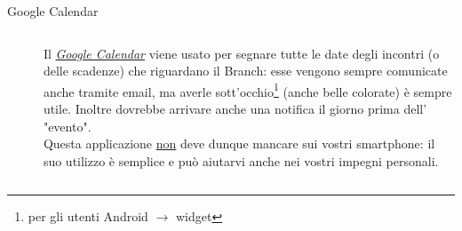 \documentclass{beamer}
\begin{document}
\begin{frame}{Google Calendar}
\begin{columns}
\begin{column}{0.5\linewidth}
\begin{figure}[h!]
\end{figure}
\end{column}
\begin{column}{0.5\linewidth}
\footnotesize
Il \textit{\underline{Google Calendar}} viene usato per segnare tutte le date degli incontri (o delle scadenze) che riguardano il Branch: esse vengono sempre comunicate anche tramite email, ma averle sott'occhio\footnote{per gli utenti Android $\rightarrow$ widget} (anche belle colorate) è sempre utile. Inoltre dovrebbe arrivare anche una notifica il giorno prima dell' "evento".\\Questa applicazione \underline{non} deve dunque mancare sui vostri smartphone: il suo utilizzo è semplice e può aiutarvi anche nei vostri impegni personali.
\end{column}
\end{columns}
\end{frame}
\end{document}
